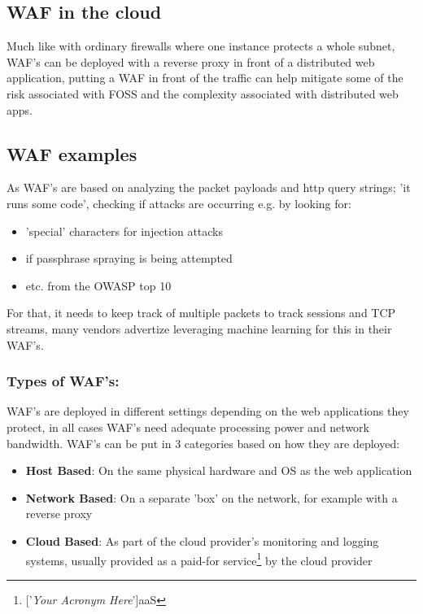 \documentclass[
	letterpaper, %
	10pt, %
	unnumberedsections, %
	twoside, %
]{APAAssignment}
\begin{document}
\subsection{WAF in the cloud}
Much like with ordinary firewalls where one instance protects a whole subnet, WAF's can be deployed with a reverse proxy in front of a distributed web application, putting a WAF in front of the traffic can help mitigate some of the risk associated with FOSS and the complexity associated with distributed web apps.


\subsection{WAF examples}
As WAF's are based on analyzing the packet payloads and http query strings; 'it runs some code', checking if attacks are occurring e.g. by looking for:

\begin{itemize}
	\item 'special' characters for injection attacks
 	\item if passphrase spraying is being attempted
    \item etc. from the OWASP top 10
\end{itemize} 

For that, it needs to keep track of multiple packets to track sessions and TCP streams, many vendors advertize leveraging machine learning for this in their WAF's\cite{OpenappsecWaf}.

\subsubsection{Types of WAF's:} WAF's are deployed in different settings depending on the web applications they protect, in all cases WAF's need adequate processing power and network bandwidth. WAF's can be put in 3 categories based on how they are deployed:

\begin{itemize}
	\item{\textbf{Host Based}: On the same physical hardware and OS as the web application}
	\item{\textbf{Network Based}: On a separate 'box' on the network, for example with a reverse proxy}
	\item{\textbf{Cloud Based}: As part of the cloud provider's monitoring and logging systems, usually provided as a paid-for service\footnote{['\textit{Your Acronym Here}']aaS} by the cloud provider} 
\end{itemize}
\end{document}
